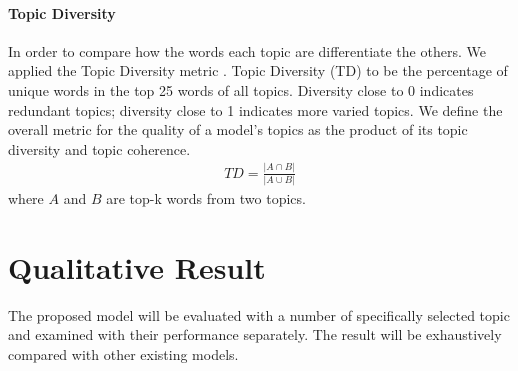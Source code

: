 \paragraph{Topic Diversity} In order to compare how the words each topic are differentiate the others. We applied the Topic Diversity metric \cite{dieng_topic_2019}. Topic Diversity (TD) to be the percentage of unique words in the top 25 words of all topics. Diversity close to 0 indicates redundant topics; diversity close to 1 indicates more varied topics. We define the overall metric for the quality of a model’s topics as the product of its topic diversity and topic coherence.
\begin{align*}
TD=\frac{|A\cap B|}{|A \cup B|}
\end{align*}
where $ A $ and $ B $ are top-k words from two topics. 
\section{Qualitative Result}The proposed model will be evaluated with a number of specifically selected topic and examined with their performance separately. The result will be exhaustively compared with other existing models.